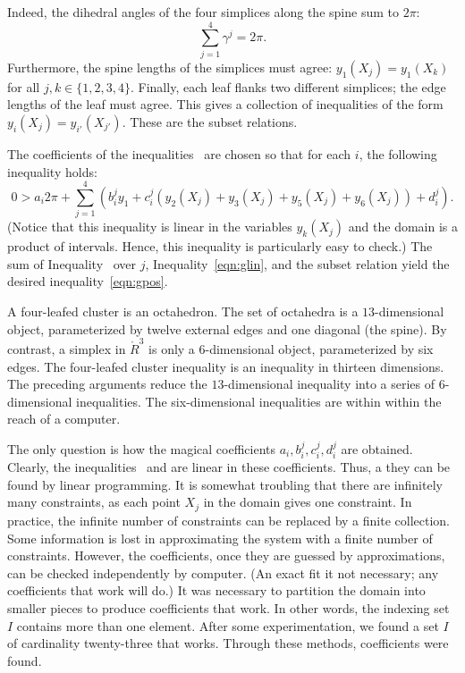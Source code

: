   Indeed, the
dihedral angles of the four simplices along the spine sum to $2\pi$:
\[  
\sum_{j=1}^4 \gamma^j = 2\pi.
\] 
Furthermore, the spine lengths of the simplices must agree: $y_1(X_j)
= y_1(X_k)$ for all $j,k\in\{1,2,3,4\}$.  Finally, each leaf flanks
two different simplices; the edge lengths of the leaf must agree.
This gives a collection of inequalities of the form $y_i(X_j) =
y_{i'}(X_{j'})$.  These are the subset relations.

The coefficients of the inequalities~
are chosen so that for each $i$, the following inequality holds:
\begin{equation}\label{eqn:glin} 
0 > a_i 2\pi + 
\sum_{j=1}^4 (b_i^j y_1 +  c_i^j (y_2(X_j)+y_3(X_j)+y_5(X_j)+y_6(X_j)) + d_i^j).
\end{equation}
(Notice that this inequality is linear in the variables $y_k(X_j)$ and
the domain is a product of intervals.  Hence, this inequality is
particularly easy to check.)  The sum of Inequality~ over $j$, Inequality~\ref{eqn:glin},
and the subset relation yield the desired inequality~\ref{eqn:gpos}.

A four-leafed cluster is an octahedron.  The set of octahedra is a
$13$-dimensional object, parameterized by twelve external edges and one
diagonal (the spine).  By contrast, a simplex in $\ring{R}^3$ is only
a $6$-dimensional object, parameterized by six edges.  The four-leafed
cluster inequality is an inequality in thirteen dimensions.  The preceding
arguments reduce the $13$-dimensional inequality into a series of
$6$-dimensional inequalities.  The six-dimensional inequalities are
within within the reach of a computer.

The only question is how the magical coefficients
$a_i,b_i^j,c_i^j,d_i^j$ are obtained.  Clearly, the
inequalities~ and  are linear in these
coefficients.  Thus, a they can be found by linear programming.  It is
somewhat troubling that there are infinitely many constraints, as each
point $X_j$ in the domain gives one constraint.  In practice, the
infinite number of constraints can be replaced by a finite collection.
Some information is lost in approximating the system with a finite
number of constraints.  However, the coefficients, once they are
guessed by approximations, can be checked independently by computer.
(An exact fit it not necessary; any coefficients that work will do.)
It was necessary to partition the domain into smaller pieces to
produce coefficients that work.  In other words, the indexing set $I$
contains more than one element.  After some experimentation, we found
a set $I$ of cardinality twenty-three that works.  Through these methods,
coefficients were found.



